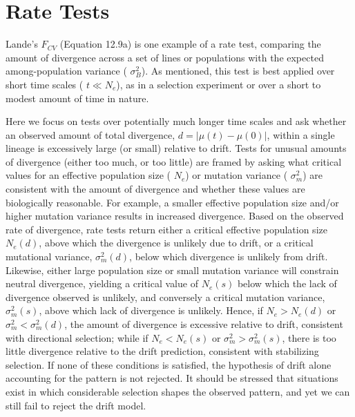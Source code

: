 \documentclass{article}
\begin{document}
\section{Rate Tests}
Lande's  $ F_{CV} $ (Equation 12.9a) is one example of a rate test, comparing the amount of divergence across a set of lines or populations with the expected among-population variance ( $ \sigma_{B}^{2} $). As mentioned, this test is best applied over short time scales ( $ t \ll N_{e} $), as in a selection experiment or over a short to modest amount of time in nature.

Here we focus on tests over potentially much longer time scales and ask whether an observed amount of total divergence,  $ d = |\mu(t) - \mu(0)| $, within a single lineage is excessively large (or small) relative to drift. Tests for unusual amounts of divergence (either too much, or too little) are framed by asking what critical values for an effective population size ( $ N_e $) or mutation variance ( $ \sigma_m^2 $) are consistent with the amount of divergence and whether these values are biologically reasonable. For example, a smaller effective population size and/or higher mutation variance results in increased divergence. Based on the observed rate of divergence, rate tests return either a critical effective population size  $ N_e(d) $, above which the divergence is unlikely due to drift, or a critical mutational variance,  $ \sigma_m^2(d) $, below which divergence is unlikely from drift. Likewise, either large population size or small mutation variance will constrain neutral divergence, yielding a critical value of  $ N_e(s) $ below which the lack of divergence observed is unlikely, and conversely a critical mutation variance,  $ \sigma_m^2(s) $, above which lack of divergence is unlikely. Hence, if  $ N_e > N_e(d) $ or  $ \sigma_m^2 < \sigma_m^2(d) $, the amount of divergence is excessive relative to drift, consistent with directional selection; while if  $ N_e < N_e(s) $ or  $ \sigma_m^2 > \sigma_m^2(s) $, there is too little divergence relative to the drift prediction, consistent with stabilizing selection. If none of these conditions is satisfied, the hypothesis of drift alone accounting for the pattern is not rejected. It should be stressed that situations exist in which considerable selection shapes the observed pattern, and yet we can still fail to reject the drift model.
\end{document}
